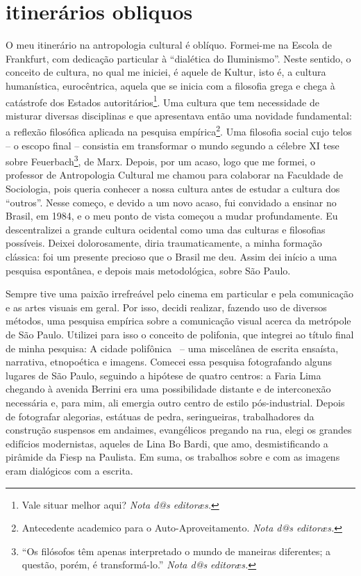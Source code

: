 \documentclass[a4paper, 12pt]{article} %
\makeatletter
\newcommand{\ftnt}[1]{\footnote{#1 \emph{Nota d@s editoræs.}}}
\makeatother
\begin{document}
\section*{itinerários obliquos}\label{sec:itine}
 O meu itinerário na antropologia cultural é oblíquo. Formei-me na Escola de Frankfurt, com dedicação particular à “dialética do Iluminismo”. Neste sentido, o conceito de cultura, no qual me iniciei, é aquele de Kultur, isto é, a cultura humanística, eurocêntrica, aquela que se inicia com a filosofia grega e chega à catástrofe dos Estados autoritários\ftnt{Vale situar melhor aqui?}. Uma cultura que tem necessidade de misturar diversas disciplinas e que apresentava então uma novidade fundamental: a reflexão filosófica aplicada na pesquisa empírica\ftnt{Antecedente academico para o Auto-Aproveitamento.}. Uma filosofia social cujo telos – o escopo final – consistia em transformar o mundo segundo a célebre XI tese sobre Feuerbach\ftnt{``Os filósofos têm apenas interpretado o mundo de maneiras diferentes; a questão, porém, é transformá-lo.''}, de Marx. Depois, por um acaso, logo que me formei, o professor de Antropologia Cultural me chamou para colaborar na Faculdade de Sociologia, pois queria conhecer a nossa cultura antes de estudar a cultura dos “outros”. Nesse começo, e devido a um novo acaso, fui convidado a ensinar no Brasil, em 1984, e o meu ponto de vista começou a mudar profundamente. Eu descentralizei a grande cultura ocidental como uma das culturas e filosofias possíveis. Deixei dolorosamente, diria traumaticamente, a minha formação clássica: foi um presente precioso que o Brasil me deu. Assim dei início a uma pesquisa espontânea, e depois mais metodológica, sobre São Paulo. 

Sempre tive uma paixão irrefreável pelo cinema em particular e pela comunicação e as artes visuais em geral. Por isso, decidi realizar, fazendo uso de diversos métodos, uma pesquisa empírica sobre a comunicação visual acerca da metrópole de São Paulo. Utilizei para isso o conceito de polifonia, que integrei ao título final de minha pesquisa: A cidade polifônica~\cite{b1} – uma miscelânea de escrita ensaísta, narrativa, etnopoética e imagens. Comecei essa pesquisa fotografando alguns lugares de São Paulo, seguindo a hipótese de quatro centros: a Faria Lima chegando à avenida Berrini era uma possibilidade distante e de interconexão necessária e, para mim, ali emergia outro centro de estilo pós-industrial. Depois de fotografar alegorias, estátuas de pedra, seringueiras, trabalhadores da construção suspensos em andaimes, evangélicos pregando na rua, elegi os grandes edifícios modernistas, aqueles de Lina Bo Bardi, que amo, desmistificando a pirâmide da Fiesp na Paulista. Em suma, os trabalhos sobre e com as imagens eram dialógicos com a escrita. 
\end{document}
